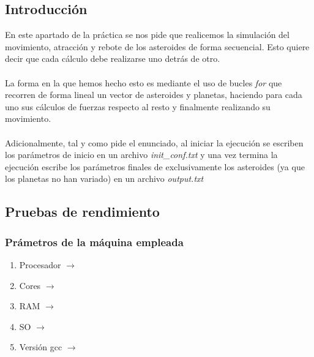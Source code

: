 \documentclass[12pt]{article}
\begin{document}
        \subsection{Introducción}
        \noindent En este apartado de la práctica se nos pide que realicemos la simulación del movimiento, atracción y rebote de los asteroides de forma secuencial. Esto quiere decir que cada cálculo debe realizarse uno detrás de otro. \\ \\
        La forma en la que hemos hecho esto es mediante el uso de bucles \textit{for} que recorren de forma lineal un vector de asteroides y planetas, haciendo para cada uno sus cálculos de fuerzas respecto al resto y finalmente realizando su movimiento.\\ \\
        Adicionalmente, tal y como pide el enunciado, al iniciar la ejecución se escriben los parámetros de inicio en un archivo \textit{init\_conf.txt} y una vez termina la ejecución escribe los parámetros finales de exclusivamente los asteroides (ya que los planetas no han variado) en un archivo \textit{output.txt}
        \noindent 
        \subsection{Pruebas de rendimiento}
        \subsubsection{Prámetros de la máquina empleada}
            \begin{enumerate}
                \item Procesador $\rightarrow$ 
                \item Cores $\rightarrow$ 
                \item RAM $\rightarrow$ 
                \item SO $\rightarrow$ 
                \item Versión gcc $\rightarrow$ 
            \end{enumerate}
\end{document}
